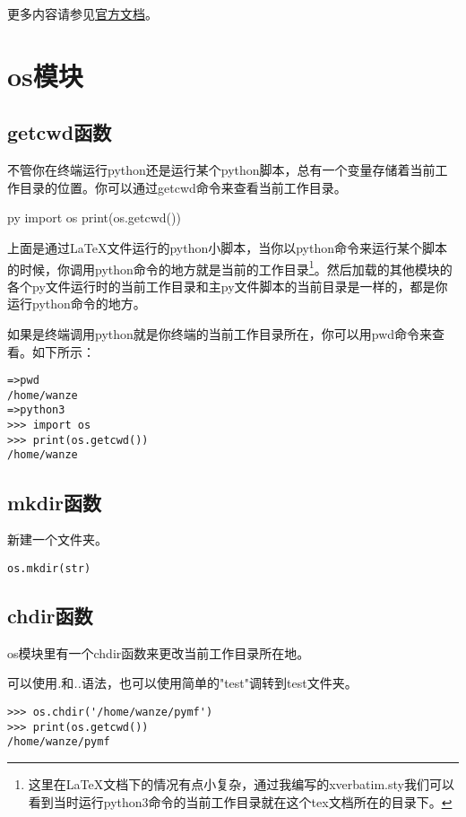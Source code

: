 \documentclass[12pt,oneside]{book}
\begin{document}
\begin{common-format}
\begin{large}
更多内容请参见\href{https://docs.python.org/3/library/subprocess.html}{官方文档}。
\end{large}



\chapter{os模块}
\section{getcwd函数}
不管你在终端运行python还是运行某个python脚本，总有一个变量存储着当前工作目录的位置。你可以通过getcwd命令来查看当前工作目录。

\begin{xverbatim}[129]{py}
import os
print(os.getcwd())
\end{xverbatim}
上面是通过\LaTeX 文件运行的python小脚本，当你以python命令来运行某个脚本的时候，你调用python命令的地方就是当前的工作目录\footnote{这里在\LaTeX 文档下的情况有点小复杂，通过我编写的xverbatim.sty我们可以看到当时运行python3命令的当前工作目录就在这个tex文档所在的目录下。}。然后加载的其他模块的各个py文件运行时的当前工作目录和主py文件脚本的当前目录是一样的，都是你运行python命令的地方。

如果是终端调用python就是你终端的当前工作目录所在，你可以用pwd命令来查看。如下所示：
\begin{Verbatim}
=>pwd
/home/wanze
=>python3
>>> import os
>>> print(os.getcwd())
/home/wanze
\end{Verbatim}

\section{mkdir函数}
新建一个文件夹。
\begin{Verbatim}
os.mkdir(str)
\end{Verbatim}


\section{chdir函数}
os模块里有一个chdir函数来更改当前工作目录所在地。

可以使用\emph{.}和\emph{..}语法，也可以使用简单的"test"调转到test文件夹。
\begin{Verbatim}
>>> os.chdir('/home/wanze/pymf')
>>> print(os.getcwd())
/home/wanze/pymf
\end{Verbatim}


\end{common-format}
\end{document}
